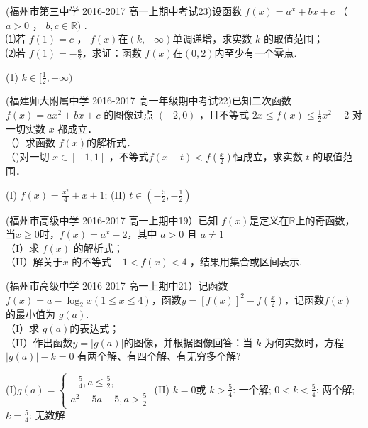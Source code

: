 \item
(福州市第三中学 2016-2017 高一上期中考试23)设函数 $f (x)=a^x+ bx +c$ （ $a> 0$ ， $b, c\in \mathbb{R})$ . \\
⑴若 $f (1)= c$ ， $f (x)$在$( k,+\infty)$单调递增，求实数 $k$ 的取值范围；\\
 ⑵若 $f( 1)=-\frac a2$，求证：函数 $f (x) $在$( 0,2) $内至少有一个零点.\\
 \begin{answer}
(1) $k\in [\frac12,+\infty) $
\end{answer} 

\item
(福建师大附属中学 2016-2017 高一年级期中考试22)已知二次函数 $f ( x )= ax^2+ bx+ c$ 的图像过点 $(-2,0)$ ，且不等式 $2 x\leq f ( x )\leq \frac12x^2+ 2$ 对一切实数 $x$ 都成立．\\
（）求函数 $f ( x ) $的解析式． \\
（)对一切 $x\in[-1,1] $ ，不等式$f(x+t)<f(\frac x2) $恒成立，求实数 $t$ 的取值范围．\\
\begin{answer}
(I) $f(x)=\frac{x^2}4+x+1 $; (II) $t\in (-\frac52,-\frac12) $
\end{answer}

\item
(福州市高级中学 2016-2017 高一上期中19）已知 $f(x)$是定义在$\mathbb{R}$上的奇函数，当$x\geq0$时，$f(x)=a^x-2$，其中 $a> 0$ 且 $a\neq 1$\\
（I）求 $f (x )$ 的解析式；\\
（II）解关于$x$ 的不等式 $-1< f(x)<4$ ，结果用集合或区间表示.\\

\item
(福州市高级中学 2016-2017 高一上期中21）记函数 $f (x )=a-\log_2{x}(1\leq x\leq 4)$，函数$y=[f(x)]^2-f(\frac x2)$，记函数$f(x)$ 的最小值为 $g( a)$.\\
（I）求 $g( a) $的表达式；\\
（II）作出函数$y=|g(a)|$的图像，并根据图像回答：当 $k$ 为何实数时，方程$|g( a)|-k=0$ 有两个解、有四个解、有无穷多个解?\\
\begin{answer}
(I)$g(a)=\begin{cases}-\frac54,a\leq\frac52,\\a^2-5a+5,a>\frac52\end{cases} $
(II) $k=0$或 $k>\frac54 $: 一个解;  $0<k<\frac54$: 两个解;   $k=\frac54$: 无数解
\end{answer}

